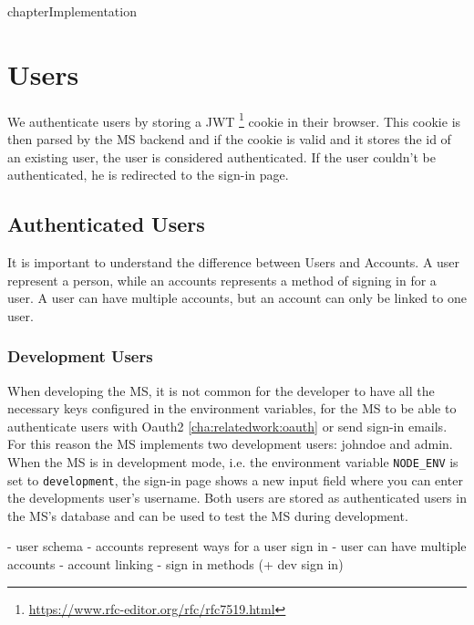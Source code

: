 chapter{Implementation}
\label{cha:implementation}

\section{Users}

We authenticate users by storing a JWT
\footnote{\url{https://www.rfc-editor.org/rfc/rfc7519.html}} cookie in their browser.
This cookie is then parsed by the MS backend and if the cookie is valid and it stores the
id of an existing user, the user is considered authenticated.
If the user couldn't be authenticated, he is redirected to the sign-in page.

\subsection{Authenticated Users}

It is important to understand the difference between Users and Accounts.
A user represent a person, while an accounts represents a method of signing in for a user.
A user can have multiple accounts, but an account can only be linked to one user.

\subsubsection{Development Users}

When developing the MS, it is not common for the developer to have all the necessary keys
configured in the environment variables, for the MS to be able to authenticate users with
Oauth2 \ref{cha:relatedwork:oauth} or send sign-in emails.
For this reason the MS implements two development users: johndoe and admin.
When the MS is in development mode, i.e. the environment variable \lstinline{NODE_ENV} is
set to \lstinline{development},
the sign-in page shows a new input field where you can enter the developments user's username.
Both users are stored as authenticated users in the MS's database and can be used to test
the MS during development.




- user schema
- accounts represent ways for a user sign in
- user can have multiple accounts
- account linking
- sign in methods (+ dev sign in)




